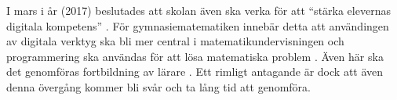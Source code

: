 \textcolor{lila}{I mars i år (2017) beslutades att skolan även ska verka för att ``stärka elevernas digitala kompetens'' \cite{regeringen}. För gymnasiematematiken innebär detta att användingen av digitala verktyg ska bli mer central i matematikundervisningen och programmering ska användas för att lösa matematiska problem \cite{itiskolan}. Även här ska det genomföras fortbildning av lärare \cite{prog_utbildning}. Ett rimligt antagande är dock att även denna övergång kommer bli svår och ta lång tid att genomföra.}
            
